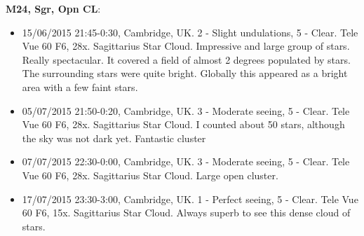 {\bf M24, Sgr, Opn CL}:
\begin{itemize}
\item 15/06/2015 21:45-0:30, Cambridge, UK. 2 - Slight undulations, 5 - Clear. Tele Vue 60 F6, 28x. Sagittarius Star Cloud. Impressive and large group of stars. Really spectacular. It covered a field of almost 2 degrees populated by stars. The surrounding stars were quite bright. Globally this appeared as a bright area with a few faint stars.
\item 05/07/2015 21:50-0:20, Cambridge, UK. 3 - Moderate seeing, 5 - Clear. Tele Vue 60 F6, 28x. Sagittarius Star Cloud. I counted about 50 stars, although the sky was not dark yet. Fantastic cluster
\item 07/07/2015 22:30-0:00, Cambridge, UK. 3 - Moderate seeing, 5 - Clear. Tele Vue 60 F6, 28x. Sagittarius Star Cloud. Large open cluster.
\item 17/07/2015 23:30-3:00, Cambridge, UK. 1 - Perfect seeing, 5 - Clear. Tele Vue 60 F6, 15x. Sagittarius Star Cloud. Always superb to see this dense cloud of stars. 
\end{itemize}
